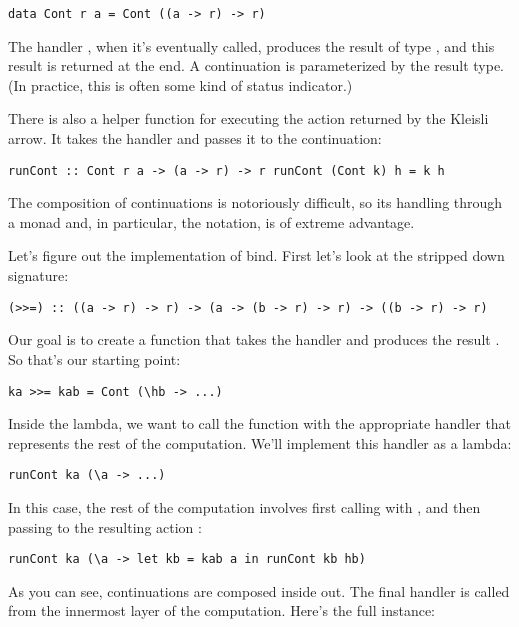 \begin{verbatim}
data Cont r a = Cont ((a -> r) -> r)
\end{verbatim}

The handler , when it's eventually called,
produces the result of type , and this result is returned at
the end. A continuation is parameterized by the result type. (In
practice, this is often some kind of status indicator.)

There is also a helper function for executing the action returned by the
Kleisli arrow. It takes the handler and passes it to the continuation:

\begin{verbatim}
runCont :: Cont r a -> (a -> r) -> r runCont (Cont k) h = k h
\end{verbatim}

The composition of continuations is notoriously difficult, so its
handling through a monad and, in particular, the  notation,
is of extreme advantage.

Let's figure out the implementation of bind. First let's look at the
stripped down signature:

\begin{verbatim}
(>>=) :: ((a -> r) -> r) -> (a -> (b -> r) -> r) -> ((b -> r) -> r)
\end{verbatim}

Our goal is to create a function that takes the handler
 and produces the result . So
that's our starting point:

\begin{verbatim}
ka >>= kab = Cont (\hb -> ...)
\end{verbatim}

Inside the lambda, we want to call the function  with the
appropriate handler that represents the rest of the computation. We'll
implement this handler as a lambda:

\begin{verbatim}
runCont ka (\a -> ...)
\end{verbatim}

In this case, the rest of the computation involves first calling
 with , and then passing  to the
resulting action :

\begin{verbatim}
runCont ka (\a -> let kb = kab a in runCont kb hb)
\end{verbatim}

As you can see, continuations are composed inside out. The final handler
 is called from the innermost layer of the computation.
Here's the full instance:

